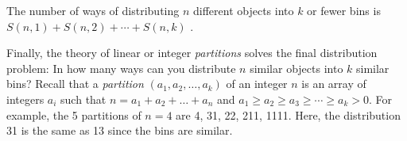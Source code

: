 \documentclass[10pt,]{book}
\theoremstyle{plain}
\theoremstyle{definition}
\theoremstyle{definition}
\numberwithin{equation}{chapter}
\newcommand{\gt}{>}
\begin{document}
\begin{assemblage}\label{assemblage-7}
\hypertarget{p-275}{}%
The number of ways of distributing \(n\) different objects into \(k\) or fewer bins is \(S\left(n,1 \right) + S\left(n,2 \right) + \cdots + S(n,k)\) .%
\end{assemblage}
\hypertarget{p-276}{}%
Finally, the theory of linear or integer \emph{partitions} solves the final distribution problem: In how many ways can you distribute \(n\) similar objects into \(k\) similar bins? Recall that a \emph{partition} \((a_{1},a_{2},\ldots,a_{k})\) of an integer \(n\) is an array of integers \(a_{i}\) such that \(n = a_{1} + a_{2} + \ldots + a_{n}\) and \(a_{1} \geq a_{2} \geq a_{3} \geq \cdots \geq a_{k} \gt 0\). For example, the 5 partitions of \(n=4\) are 4, 31, 22, 211, 1111. Here, the distribution 31 is the same as 13 since the bins are similar.%
\typeout{************************************************}
\typeout{************************************************}
\end{document}
